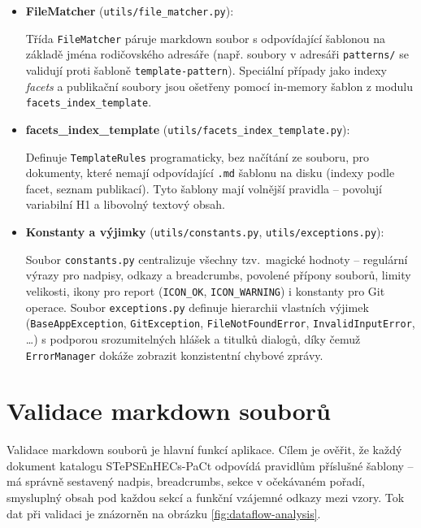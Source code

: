 \documentclass[12pt, a4paper]{article}
\begin{document}
\begin{itemize}
\begin{itemize}
        \item \textbf{FileMatcher} (\texttt{utils/file\_matcher.py}):

        Třída \texttt{FileMatcher} páruje markdown soubor s odpovídající šablonou na základě jména rodičovského
        adresáře (např. soubory v adresáři \texttt{patterns/} se validují proti šabloně
        \texttt{template-pattern}). Speciální případy jako indexy \emph{facets} a publikační
        soubory jsou ošetřeny pomocí in-memory šablon z modulu \texttt{facets\_index\_template}.

        \item \textbf{facets\_index\_template} (\texttt{utils/facets\_index\_template.py}):

        Definuje \texttt{TemplateRules} programaticky, bez načítání ze souboru, pro dokumenty,
        které nemají odpovídající \texttt{.md} šablonu na disku
        (indexy podle facet, seznam publikací). Tyto šablony mají volnější pravidla --
        povolují variabilní H1 a libovolný textový obsah.

        \item \textbf{Konstanty a výjimky} (\texttt{utils/constants.py}, \texttt{utils/exceptions.py}):

        Soubor \texttt{constants.py} centralizuje všechny tzv.\ magické hodnoty -- regulární výrazy
        pro nadpisy, odkazy a breadcrumbs, povolené přípony souborů, limity velikosti, ikony pro
        report (\texttt{ICON\_OK}, \texttt{ICON\_WARNING}) i konstanty pro Git operace.
        Soubor \texttt{exceptions.py} definuje hierarchii vlastních výjimek
        (\texttt{BaseAppException}, \texttt{GitException}, \texttt{FileNotFoundError},
        \texttt{InvalidInputError}, \ldots) s podporou srozumitelných hlášek a titulků
        dialogů, díky čemuž \texttt{ErrorManager} dokáže zobrazit konzistentní chybové zprávy.
    \end{itemize}
\end{itemize}

\section{Validace markdown souborů}

Validace markdown souborů je hlavní funkcí aplikace. Cílem je ověřit, že každý dokument
katalogu STePSEnHECs-PaCt odpovídá pravidlům příslušné šablony -- má správně sestavený
nadpis, breadcrumbs, sekce v očekávaném pořadí, smysluplný obsah pod každou sekcí a funkční
vzájemné odkazy mezi vzory. Tok dat při validaci je znázorněn na obrázku
\ref{fig:dataflow-analysis}.
\end{document}
